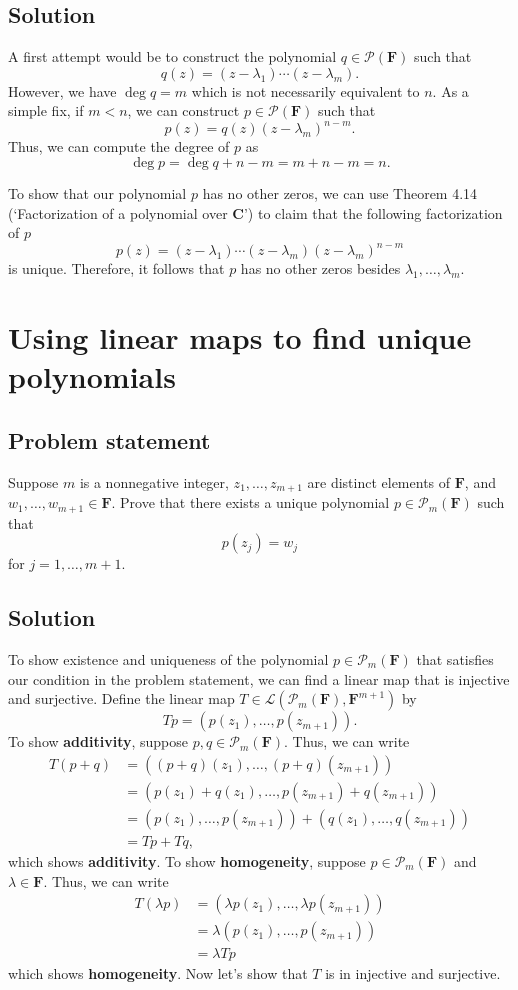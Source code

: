 \documentclass{article}
\begin{document}
\subsection*{Solution}
A first attempt would be to construct the polynomial $q\in\mathcal{P}(\mathbf{F})$ such that
\[q(z)=(z-\lambda_1)\cdots(z-\lambda_m).\]
However, we have $\deg q=m$ which is not necessarily equivalent to $n$. 
As a simple fix, if $m<n$, we can construct $p\in\mathcal{P}(\mathbf{F})$ such that
\[p(z)=q(z)(z-\lambda_m)^{n-m}.\]
Thus, we can compute the degree of $p$ as
\[\deg p=\deg q+n-m=m+n-m=n.\]

To show that our polynomial $p$ has no other zeros, we can use Theorem 4.14 (`Factorization of a polynomial over $\mathbf{C}$') to claim that the following factorization of $p$
\[p(z)=(z-\lambda_1)\cdots(z-\lambda_m)(z-\lambda_m)^{n-m}\]
is unique.
Therefore, it follows that $p$ has no other zeros besides $\lambda_1,\ldots,\lambda_m$.

\clearpage

\section{Using linear maps to find unique polynomials}
\subsection*{Problem statement}
Suppose $m$ is a nonnegative integer, $z_1,\ldots,z_{m+1}$ are distinct elements of $\mathbf{F}$, and $w_1,\ldots,w_{m+1}\in\mathbf{F}$. 
Prove that there exists a unique polynomial $p\in\mathcal{P}_m(\mathbf{F})$ such that
\[p(z_j)=w_j\]
for $j=1,\ldots,m+1$.

\subsection*{Solution}
To show existence and uniqueness of the polynomial $p\in\mathcal{P}_m(\mathbf{F})$ that satisfies our condition in the problem statement, we can find a linear map that is injective and surjective. 
Define the linear map $T\in\mathcal{L}(\mathcal{P}_m(\mathbf{F}),\mathbf{F}^{m+1})$ by
\[Tp=(p(z_1),\ldots,p(z_{m+1})).\]
To show \textbf{additivity}, suppose $p,q\in\mathcal{P}_m(\mathbf{F})$. 
Thus, we can write
\begin{align*}
    T(p+q)&=((p+q)(z_1),\ldots,(p+q)(z_{m+1}))\\
    &=(p(z_1)+q(z_1),\ldots,p(z_{m+1})+q(z_{m+1}))\\
    &=(p(z_1),\ldots,p(z_{m+1}))+(q(z_1),\ldots,q(z_{m+1}))\\
    &=Tp+Tq,
\end{align*}
which shows \textbf{additivity}. 
To show \textbf{homogeneity}, suppose $p\in\mathcal{P}_m(\mathbf{F})$ and $\lambda\in\mathbf{F}$. 
Thus, we can write
\begin{align*}
    T(\lambda p)&=(\lambda p(z_1),\ldots,\lambda p(z_{m+1}))\\
    &=\lambda(p(z_1),\ldots,p(z_{m+1}))\\
    &=\lambda Tp
\end{align*}
which shows \textbf{homogeneity}. 
Now let's show that $T$ is in injective and surjective. 
\end{document}
